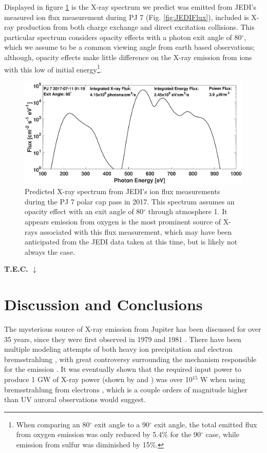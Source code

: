 \documentclass[draft]{agujournal2018}
\begin{document}
Displayed in figure \ref{fig:JEDISpec} is the X-ray spectrum we predict was emitted from JEDI's measured ion flux measurement during PJ 7 (Fig. \ref{fig:JEDIFlux}), included is X-ray production from both charge exchange and direct excitation collisions.
This particular spectrum considers opacity effects with a photon exit angle of 80$^{\circ}$, which we assume to be a common viewing angle from earth based observations; although, opacity effects make little difference on the X-ray emission from ions with this low of initial energy\footnote{When comparing an 80$^{\circ}$ exit angle to a 90$^{\circ}$ exit angle, the total emitted flux from oxygen emission was only reduced by 5.4$\%$ for the 90$^{\circ}$ case, while emission from sulfur was diminished by 15$\%$.}.

\begin{figure}[ht]
    \centering
    \includegraphics[width=\textwidth]{Figures/PJ7Spectrum.eps}
    \caption{Predicted X-ray spectrum from JEDI's ion flux measurements during the PJ 7 polar cap pass in 2017. This spectrum assumes an opacity effect with an exit angle of 80$^{\circ}$ through atmosphere 1. It appears emission from oxygen is the most prominent source of X-rays associated with this flux measurement, which may have been anticipated from the JEDI data taken at this time, but is likely  not always the case.}
    \label{fig:JEDISpec}
\end{figure}

\noindent\textbf{\Large T.E.C. $\downarrow$}

\section{Discussion and Conclusions}

The mysterious source of X-ray emission from Jupiter has been discussed for over 35 years, since they were first observed in 1979 and 1981 \citep{metzger1983}.
There have been multiple modeling attempts of both heavy ion precipitation \citep{horanyi1988,cravens1995,ozak2010,ozak2013,houston2018} and electron bremsstrahlung \citep{metzger1983,waite1991,barbosa1992,singhal1992}, with great controversy surrounding the mechanism responsible for the emission \citep{barbosa1990,waite1991,barbosa1992}.
It was eventually shown that the required input power to produce 1 GW of X-ray power (shown by \citet{branduardi2004} and \citet{elsner2005}) was over 10$^{15}$ W when using bremsstrahlung from electrons \citep{waite1991,waite1994}, which is a couple orders of magnitude higher than UV auroral observations would suggest.
\end{document}
